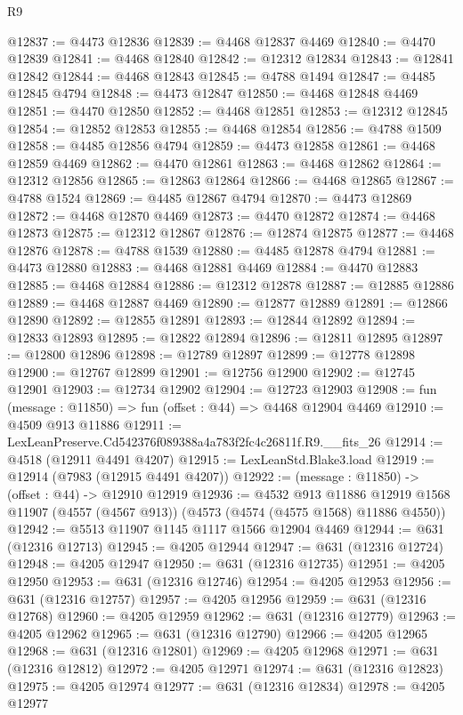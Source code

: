 \begin{lexlean}{R9}
\begin{coremodule}
@12837 := @4473 @12836
@12839 := @4468 @12837 @4469
@12840 := @4470 @12839
@12841 := @4468 @12840
@12842 := @12312 @12834
@12843 := @12841 @12842
@12844 := @4468 @12843
@12845 := @4788 @1494
@12847 := @4485 @12845 @4794
@12848 := @4473 @12847
@12850 := @4468 @12848 @4469
@12851 := @4470 @12850
@12852 := @4468 @12851
@12853 := @12312 @12845
@12854 := @12852 @12853
@12855 := @4468 @12854
@12856 := @4788 @1509
@12858 := @4485 @12856 @4794
@12859 := @4473 @12858
@12861 := @4468 @12859 @4469
@12862 := @4470 @12861
@12863 := @4468 @12862
@12864 := @12312 @12856
@12865 := @12863 @12864
@12866 := @4468 @12865
@12867 := @4788 @1524
@12869 := @4485 @12867 @4794
@12870 := @4473 @12869
@12872 := @4468 @12870 @4469
@12873 := @4470 @12872
@12874 := @4468 @12873
@12875 := @12312 @12867
@12876 := @12874 @12875
@12877 := @4468 @12876
@12878 := @4788 @1539
@12880 := @4485 @12878 @4794
@12881 := @4473 @12880
@12883 := @4468 @12881 @4469
@12884 := @4470 @12883
@12885 := @4468 @12884
@12886 := @12312 @12878
@12887 := @12885 @12886
@12889 := @4468 @12887 @4469
@12890 := @12877 @12889
@12891 := @12866 @12890
@12892 := @12855 @12891
@12893 := @12844 @12892
@12894 := @12833 @12893
@12895 := @12822 @12894
@12896 := @12811 @12895
@12897 := @12800 @12896
@12898 := @12789 @12897
@12899 := @12778 @12898
@12900 := @12767 @12899
@12901 := @12756 @12900
@12902 := @12745 @12901
@12903 := @12734 @12902
@12904 := @12723 @12903
@12908 := fun (message : @11850) => fun (offset : @44) => @4468 @12904 @4469
@12910 := @4509 @913 @11886
@12911 := LexLeanPreserve.Cd542376f089388a4a783f2fc4c26811f.R9.__fits_26
@12914 := @4518 (@12911 @4491 @4207)
@12915 := LexLeanStd.Blake3.load
@12919 := @12914 (@7983 (@12915 @4491 @4207))
@12922 := (message : @11850) -> (offset : @44) -> @12910 @12919
@12936 := @4532
    @913
    @11886
    @12919
    @1568
    @11907
    (@4557 (@4567 @913))
    (@4573 (@4574 (@4575 @1568) @11886 @4550))
@12942 := @5513 @11907 @1145 @1117 @1566 @12904 @4469
@12944 := @631 (@12316 @12713)
@12945 := @4205 @12944
@12947 := @631 (@12316 @12724)
@12948 := @4205 @12947
@12950 := @631 (@12316 @12735)
@12951 := @4205 @12950
@12953 := @631 (@12316 @12746)
@12954 := @4205 @12953
@12956 := @631 (@12316 @12757)
@12957 := @4205 @12956
@12959 := @631 (@12316 @12768)
@12960 := @4205 @12959
@12962 := @631 (@12316 @12779)
@12963 := @4205 @12962
@12965 := @631 (@12316 @12790)
@12966 := @4205 @12965
@12968 := @631 (@12316 @12801)
@12969 := @4205 @12968
@12971 := @631 (@12316 @12812)
@12972 := @4205 @12971
@12974 := @631 (@12316 @12823)
@12975 := @4205 @12974
@12977 := @631 (@12316 @12834)
@12978 := @4205 @12977

\end{coremodule}
\end{lexlean}
